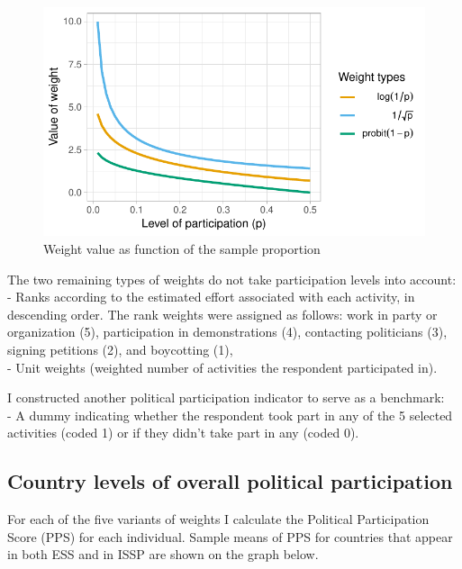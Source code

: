 \documentclass[12pt,]{article}
\begin{document}
\begin{figure}[H]

{\centering \includegraphics{report_files/figure-latex/weights-1} 

}

\caption{Weight value as function of the sample proportion}\label{fig:weights}
\end{figure}

The two remaining types of weights do not take participation levels into account:\\
- Ranks according to the estimated effort associated with each activity, in descending order. The rank weights were assigned as follows: work in party or organization (5), participation in demonstrations (4), contacting politicians (3), signing petitions (2), and boycotting (1),\\
- Unit weights (weighted number of activities the respondent participated in).

I constructed another political participation indicator to serve as a benchmark:\\
- A dummy indicating whether the respondent took part in any of the 5 selected activities (coded 1) or if they didn't take part in any (coded 0).

\hypertarget{country-levels-of-overall-political-participation}{%
\subsection{Country levels of overall political participation}\label{country-levels-of-overall-political-participation}}

For each of the five variants of weights I calculate the Political Participation Score (PPS) for each individual. Sample means of PPS for countries that appear in both ESS and in ISSP are shown on the graph below.
\end{document}
